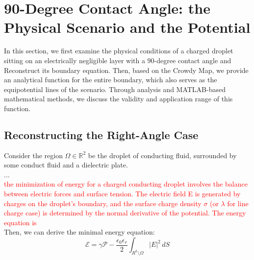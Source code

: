 \chapter{90-Degree Contact Angle: the Physical Scenario and the Potential}

In this section, we first examine the physical conditions of a charged droplet sitting on an electrically negligible layer with a 90-degree contact angle and Reconstruct its boundary equation. Then, based on the Crowdy Map, we provide an analytical function for the entire boundary, which also serves as the equipotential lines of the scenario. Through analysis and MATLAB-based mathematical methods, we discuss the validity and application range of this function.

\section{Reconstructing the Right-Angle Case}
Consider the region $\Omega\in\mathbb{R}^2$ be the droplet of conducting fluid, surrounded by some conduct fluid and a dielectric plate. \\
...\\
\textcolor{red}{the minimization of energy for a charged conducting droplet involves the balance between electric forces and surface tension. The electric field E is generated by charges on the droplet's boundary, and the surface charge density $\sigma$ (or $\lambda$ for line charge case) is determined by the normal derivative of the potential. The energy equation is}\\
Then, we can derive the minimal energy equation:
\begin{equation}\label{minE}
    \mathcal{E} = \gamma \mathcal{P} - \frac{\epsilon_0 \epsilon_r}{2} \int_{R^2 \setminus \Omega} |E|^2 \, dS
\end{equation}

